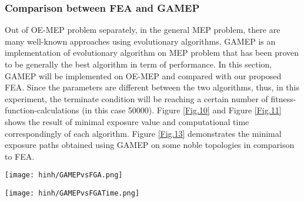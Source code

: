 \documentclass[final]{elsarticle}
\begin{document}
\subsubsection{Comparison between FEA and GAMEP}
Out of OE-MEP problem separately, in the general MEP problem, there are many well-known approaches using evolutionary algorithms. GAMEP \cite{binh2019efficient} is an implementation of evolutionary algorithm on MEP problem that has been proven to be generally the best algorithm in term of performance. In this section, GAMEP will be implemented on OE-MEP and compared with our proposed FEA. Since the parameters are different between the two algorithms, thus, in this experiment, the terminate condition will be reaching a certain number of fitness-function-calculations (in this case 50000). Figure \ref{Fig.10} and Figure \ref{Fig.11} shows the result of minimal exposure value and computational time correspondingly of each algorithm. Figure \ref{Fig.13} demonstrates the minimal exposure paths obtained using GAMEP on some noble topologies in comparison to FEA.
\begin{figure*}[h]
	\texttt{[image: hinh/GAMEPvsFGA.png]}
	\centering
	\caption{The minimal exposure value comparison between FEA and GAMEP on some noble topologies
	}
	\label{Fig.10}       %
\end{figure*}
\begin{figure*}[h]
	\texttt{[image: hinh/GAMEPvsFGATime.png]}
	\centering
	\caption{The computational time (sec) comparison between FEA and GAMEP on some noble topologies
	}
	\label{Fig.11}       %
\end{figure*}
\end{document}
